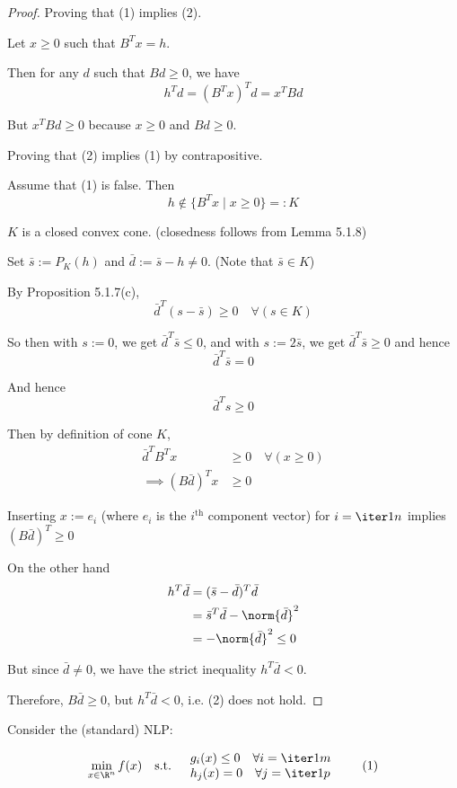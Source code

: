 \begin{proof}
	Proving that (1) implies (2).

	Let $x\geq0$ such that $B^Tx=h$.

	Then for any $d$ such that $Bd\geq0$, we have
	$$
		h^Td = (B^Tx)^Td = x^TBd
	$$

	But $x^TBd\geq0$ because $x\geq0$ and $Bd\geq0$.

	Proving that (2) implies (1) by contrapositive.

	Assume that (1) is false. Then
	$$
		h\notin\{B^Tx \mid x\geq0\}=:K
	$$

	$K$ is a closed convex cone. (closedness follows from Lemma 5.1.8)

	Set $\bar s:=P_K(h)$ and $\bar d:=\bar s-h\neq0$. (Note that $\bar
		s\in K$)

	By Proposition 5.1.7(c),
	$$
		\bar d^T(s-\bar s)\geq0\quad\forall(s\in K)
	$$

	So then with $s:=0$, we get $\bar d^T\bar s\leq0$, and with
	$s:=2\bar s$, we get $\bar d^T\bar s\geq0$ and hence
	$$
		\bar d^T\bar s=0
	$$

	And hence
	$$
		\bar d^Ts\geq0
	$$

	Then by definition of cone $K$,
	\begin{align}
		\bar d^T B^Tx         & \geq0\quad\forall(x\geq0) \\
		\implies (B\bar d)^Tx & \geq 0
	\end{align}


	Inserting $x:=e_i$ (where $e_i$ is the $i^\text{th}$ component
	vector) for $i=\iter1n$ implies $(B\bar d)^T\geq0$

	On the other hand
	\begin{align}
		h^T\bar d & = (\bar s-\bar d)^T\bar d        \\
		          & = \bar s^T\bar d-\norm{\bar d}^2 \\
		          & = -\norm{\bar d}^2 \leq 0
	\end{align}

	But since $\bar d\neq0$, we have the strict inequality $h^T\bar d<0$.

	Therefore, $B\bar d\geq0$, but $h^T\bar d<0$, i.e. (2) does not
	hold.
\end{proof}

\label{b38093d}

Consider the (standard) NLP:

\begin{equation}
	\min_{x\in\R^n} f(x)\quad\text{s.t.}\quad\begin{array}{l}
		g_i(x)\leq0 \quad\forall i=\iter1m \\
		h_j(x)=0    \quad\forall j=\iter1p
	\end{array}
	\tag*{(1)}
\end{equation}


